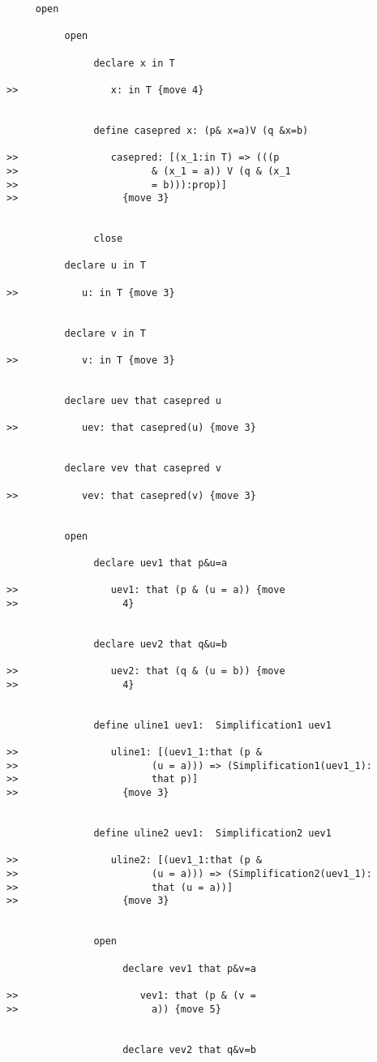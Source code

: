 \documentclass[12pt]{article}
\begin{document}
\begin{verbatim}
     open

          open 

               declare x in T

>>                x: in T {move 4}


               define casepred x: (p& x=a)V (q &x=b)

>>                casepred: [(x_1:in T) => (((p 
>>                       & (x_1 = a)) V (q & (x_1 
>>                       = b))):prop)]
>>                  {move 3}


               close

          declare u in T

>>           u: in T {move 3}


          declare v in T

>>           v: in T {move 3}


          declare uev that casepred u

>>           uev: that casepred(u) {move 3}


          declare vev that casepred v

>>           vev: that casepred(v) {move 3}


          open

               declare uev1 that p&u=a

>>                uev1: that (p & (u = a)) {move 
>>                  4}


               declare uev2 that q&u=b

>>                uev2: that (q & (u = b)) {move 
>>                  4}


               define uline1 uev1:  Simplification1 uev1

>>                uline1: [(uev1_1:that (p & 
>>                       (u = a))) => (Simplification1(uev1_1):
>>                       that p)]
>>                  {move 3}


               define uline2 uev1:  Simplification2 uev1

>>                uline2: [(uev1_1:that (p & 
>>                       (u = a))) => (Simplification2(uev1_1):
>>                       that (u = a))]
>>                  {move 3}


               open

                    declare vev1 that p&v=a

>>                     vev1: that (p & (v = 
>>                       a)) {move 5}


                    declare vev2 that q&v=b


\end{verbatim}
\end{document}
